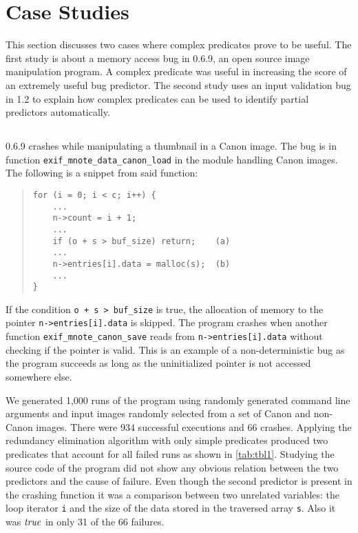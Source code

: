 
\section{Case Studies}
\label{sec-qual}
This section discusses two cases where complex predicates prove to be useful.  The first study is about a memory access bug in  0.6.9, an open source image manipulation program.  A complex predicate was useful in increasing the score of an extremely useful bug predictor.  The second study uses an input validation bug in  1.2 to explain how complex predicates can be used to identify partial predictors automatically.

\subsection{\large\textbf{}}
\label{sec-exif}

 0.6.9 crashes while manipulating a thumbnail in a Canon image.  The bug is in function \texttt{exif\_mnote\_data\_canon\_load} in the module handling Canon images.  The following is a snippet from said function:
\begin{quote}
\begin{verbatim}
for (i = 0; i < c; i++) {
    ...
    n->count = i + 1;
    ...
    if (o + s > buf_size) return;    (a)
    ...
    n->entries[i].data = malloc(s);  (b)
    ...
}
\end{verbatim}
\end{quote}

If the condition \texttt{o + s > buf\_size} is true, the allocation of memory to the pointer \texttt{n->entries[i].data} is skipped.  The program crashes when another function \texttt{exif\_mnote\_canon\_save} reads from \texttt{n->entries[i].data} without checking if the pointer is valid.  This is an example of a non-deterministic bug as the program succeeds as long as the uninitialized pointer is not accessed somewhere else.

We generated 1,000 runs of the program using randomly generated command line arguments and input images randomly selected from a set of Canon and non-Canon images.  There were 934 successful executions and 66 crashes.  Applying the redundancy elimination algorithm with only simple predicates produced two predicates that account for all failed runs as shown in \autoref{tab:tbl1}.  Studying the source code of the program did not show any obvious relation between the two predictors and the cause of failure.  Even though the second predictor is present in the crashing function it was a comparison between two unrelated variables: the loop iterator \texttt{i} and the size of the data stored in the traversed array \texttt{s}.  Also it was $\mathit{true}$ in only 31 of the 66 failures.

